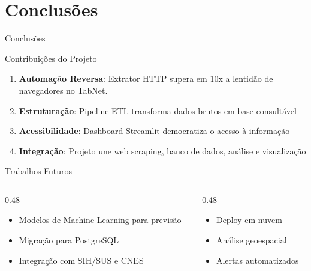 \documentclass[aspectratio=169,10pt]{beamer}
\begin{document}
\section{Conclusões}
\begin{frame}{Conclusões}

\begin{block}{Contribuições do Projeto}
\begin{enumerate}
    \item \textbf{Automação Reversa}: Extrator HTTP supera em 10x a lentidão de navegadores no TabNet.
    \item \textbf{Estruturação}: Pipeline ETL transforma dados brutos em base consultável
    \item \textbf{Acessibilidade}: Dashboard Streamlit democratiza o acesso à informação
    \item \textbf{Integração}: Projeto une web scraping, banco de dados, análise e visualização
\end{enumerate}
\end{block}

\vspace{0.3cm}

\begin{exampleblock}{Trabalhos Futuros}
\begin{columns}[T]
\begin{column}{0.48\textwidth}
\begin{itemize}
    \item Modelos de Machine Learning para previsão
    \item Migração para PostgreSQL
    \item Integração com SIH/SUS e CNES
\end{itemize}
\end{column}
\begin{column}{0.48\textwidth}
\begin{itemize}
    \item Deploy em nuvem
    \item Análise geoespacial
    \item Alertas automatizados
\end{itemize}
\end{column}
\end{columns}
\end{exampleblock}

\end{frame}
\end{document}
